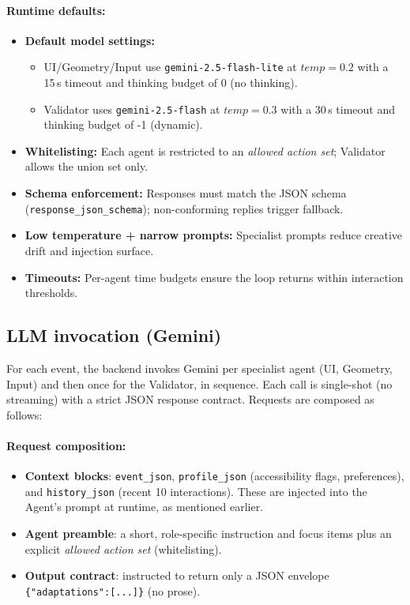 \documentclass[openany]{book}
\begin{document}
\paragraph{Runtime defaults:}
\begin{itemize}
  \item \textbf{Default model settings:} 
    \begin{itemize}
        \item UI/Geometry/Input use \texttt{gemini-2.5-flash-lite} at $temp{=}0.2$ with a 15\,s timeout and thinking budget of 0 (no thinking).
        \item Validator uses \texttt{gemini-2.5-flash} at $temp{=}0.3$ with a 30\,s timeout and thinking budget of -1 (dynamic).
    \end{itemize}
  \item \textbf{Whitelisting:} Each agent is restricted to an \emph{allowed action set}; Validator allows the union set only.
  \item \textbf{Schema enforcement:} Responses must match the JSON schema (\texttt{response\_json\_schema}); non-conforming replies trigger fallback.
  \item \textbf{Low temperature + narrow prompts:} Specialist prompts reduce creative drift and injection surface.
  \item \textbf{Timeouts:} Per-agent time budgets ensure the loop returns within interaction thresholds.
\end{itemize}
\newpage

\subsection{LLM invocation (Gemini)}
For each event, the backend invokes Gemini per specialist agent (UI, Geometry, Input) and then once for the Validator, in sequence. Each call is single-shot (no streaming) with a strict JSON response contract. Requests are composed as follows:

\paragraph{Request composition:}
\begin{itemize}
  \item \textbf{Context blocks}: \texttt{event\_json}, \texttt{profile\_json} (accessibility flags, preferences), and \texttt{history\_json} (recent 10 interactions). These are injected into the Agent's prompt at runtime, as mentioned earlier.
  \item \textbf{Agent preamble}: a short, role-specific instruction and focus items plus an explicit \emph{allowed action set} (whitelisting).
  \item \textbf{Output contract}: instructed to return only a JSON envelope \texttt{\{"adaptations":[...]\}} (no prose).
\end{itemize}
\end{document}
